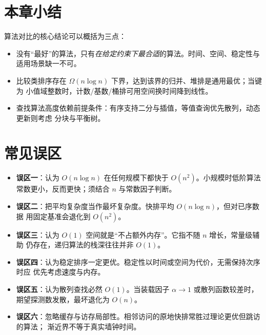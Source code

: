\section{本章小结}

算法对比的核心结论可以概括为三点：

\begin{itemize}
    \item 没有“最好”的算法，只有\emph{在给定约束下最合适}的算法。时间、空间、稳定性与
          适用场景缺一不可。
    \item 比较类排序存在 $\Omega(n\log n)$ 下界，达到该界的归并、堆排是通用最优；当键为
          小值域整数时，计数/基数/桶排可用空间换时间降到线性。
    \item 查找算法高度依赖前提条件：有序支持二分与插值，等值查询优先散列，动态更新则考虑
          分块与平衡树。
\end{itemize}

\section{常见误区}

\begin{itemize}
    \item \textbf{误区一}：认为 $O(n\log n)$ 在任何规模下都快于 $O(n^2)$。小规模时低阶算法
          常数更小，反而更快；须结合 $n$ 与常数因子判断。
    \item \textbf{误区二}：把平均复杂度当作最坏复杂度。快排平均 $O(n\log n)$，但对已序数据
          用固定基准会退化到 $O(n^2)$。
    \item \textbf{误区三}：认为 $O(1)$ 空间就是“不占额外内存”。它指不随 $n$ 增长，常量级辅助
          仍存在，递归算法的栈深往往并非 $O(1)$。
    \item \textbf{误区四}：认为稳定排序一定更优。稳定性以时间或空间为代价，无需保持次序时应
          优先考虑速度与内存。
    \item \textbf{误区五}：认为散列查找必然 $O(1)$。当装载因子 $\alpha\to1$ 或散列函数较差时，
          期望探测数发散，最坏退化为 $O(n)$。
    \item \textbf{误区六}：忽略缓存与访存局部性。相邻访问的原地快排常胜过理论更优但跳访的算法；
          渐近界不等于真实墙钟时间。
\end{itemize}
